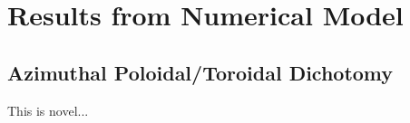 
\chapter{Results from Numerical Model}
\label{results_chapter}

\section{Azimuthal Poloidal/Toroidal Dichotomy}

This is novel...



